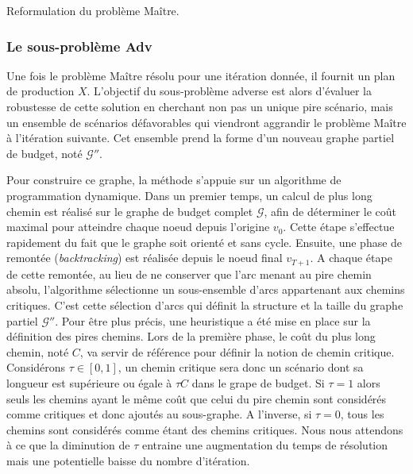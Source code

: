 \documentclass[12pt, a4paper, twoside]{report}
\numberwithin{equation}{section}
\newcommand{\adv}{\textbf{Adv} }
\begin{document}
	\vspace{-0.5em}
	{   \centering
		\small Reformulation du problème Maître.\cite{portoleau:tel-04631599}\par
		\label{reformulation_pbr_maitre}
	}
	
	\subsubsection{Le sous-problème \adv}
	
	Une fois le problème Maître résolu pour une itération donnée, il fournit un plan de production $X$. L'objectif du sous-problème adverse est alors d'évaluer la robustesse de cette solution en cherchant non pas un unique pire scénario, mais un ensemble de scénarios défavorables qui viendront aggrandir le problème Maître à l'itération suivante. Cet ensemble prend la forme d'un nouveau graphe partiel de budget, noté $\mathcal{G}''$.
	
	Pour construire ce graphe, la méthode s'appuie sur un algorithme de programmation dynamique. Dans un premier temps, un calcul de plus long chemin est réalisé sur le graphe de budget complet $\mathcal{G}$, afin de déterminer le coût maximal pour atteindre chaque noeud depuis l'origine $v_0$. Cette étape s'effectue rapidement du fait que le graphe soit orienté et sans cycle. Ensuite, une phase de remontée (\textit{backtracking}) est réalisée depuis le noeud final $v_{T+1}$. A chaque étape de cette remontée, au lieu de ne conserver que l'arc menant au pire chemin absolu, l'algorithme sélectionne un sous-ensemble d'arcs appartenant aux chemins critiques. C'est cette sélection d'arcs qui définit la structure et la taille du graphe partiel $\mathcal{G}''$. Pour être plus précis, une heuristique a été mise en place sur la définition des pires chemins. Lors de la première phase, le coût du plus long chemin, noté $C$, va servir de référence pour définir la notion de chemin critique. Considérons $\tau\in[0, 1]$, un chemin critique sera donc un scénario dont sa longueur est supérieure ou égale à $\tau C$ dans le grape de budget. Si $\tau=1$ alors seuls les chemins ayant le même coût que celui du pire chemin sont considérés comme critiques et donc ajoutés au sous-graphe. A l'inverse, si $\tau=0$, tous les chemins sont considérés comme étant des chemins critiques. Nous nous attendons à ce que la diminution de $\tau$ entraine une augmentation du temps de résolution mais une potentielle baisse du nombre d'itération.
	
\end{document}
